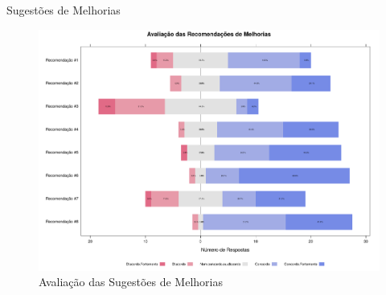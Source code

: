 \documentclass[t,14pt,mathserif]{beamer}
\begin{document}
\begin{frame}{Sugestões de Melhorias}

    \begin{figure}[htpb]
        \centering
        \includegraphics[width=.9\linewidth]{../img/plot_likert_avaliacao_sug_melhorias.pdf}
        \caption{Avaliação das Sugestões de Melhorias}
\label{fig:plot_likert_avaliacao_sug_melhorias}
    \end{figure}

\end{frame}
\end{document}

